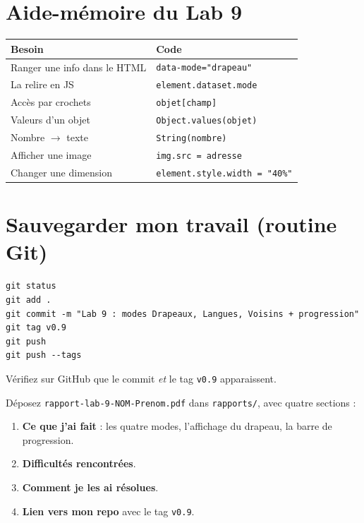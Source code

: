 \documentclass[11pt,a4paper]{article}
\newcommand{\code}[1]{\texttt{#1}}
\begin{document}
\section{Aide-mémoire du Lab 9}

\begin{center}
\begin{tabular}{p{5.6cm} p{7.4cm}}
\toprule
\textbf{Besoin} & \textbf{Code} \\
\midrule
Ranger une info dans le HTML & \code{data-mode="drapeau"} \\
La relire en JS & \code{element.dataset.mode} \\
Accès par crochets & \code{objet[champ]} \\
Valeurs d'un objet & \code{Object.values(objet)} \\
Nombre $\rightarrow$ texte & \code{String(nombre)} \\
Afficher une image & \code{img.src = adresse} \\
Changer une dimension & \code{element.style.width = "40\%"} \\
\bottomrule
\end{tabular}
\end{center}

\section{Sauvegarder mon travail (routine Git)}

\begin{retenirbox}
\begin{lstlisting}[style=html]
git status
git add .
git commit -m "Lab 9 : modes Drapeaux, Langues, Voisins + progression"
git tag v0.9
git push
git push --tags
\end{lstlisting}
Vérifiez sur GitHub que le commit \emph{et} le tag \code{v0.9} apparaissent.
\end{retenirbox}

\begin{attentionbox}
Déposez \code{rapport-lab-9-NOM-Prenom.pdf} dans \code{rapports/}, avec quatre sections :
\begin{enumerate}[leftmargin=*,noitemsep]
  \item \textbf{Ce que j'ai fait} : les quatre modes, l'affichage du drapeau, la barre de progression.
  \item \textbf{Difficultés rencontrées}.
  \item \textbf{Comment je les ai résolues}.
  \item \textbf{Lien vers mon repo} avec le tag \code{v0.9}.
\end{enumerate}
\end{attentionbox}
\end{document}
